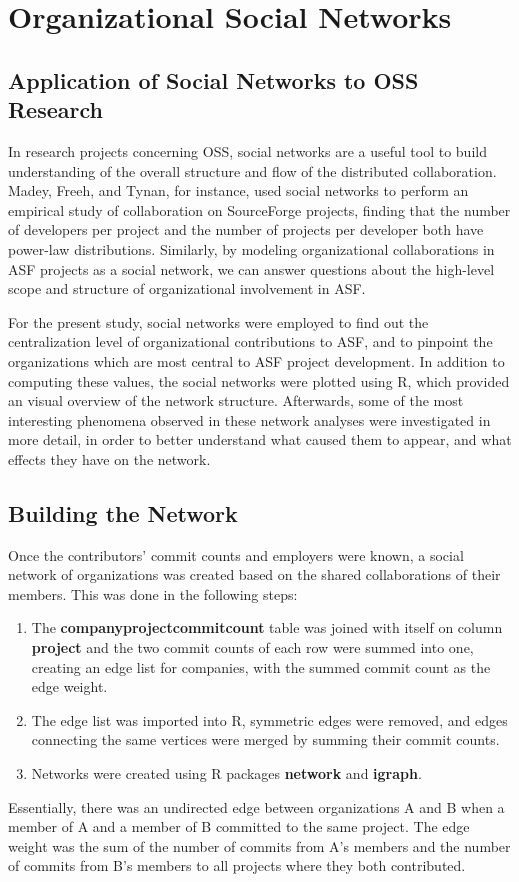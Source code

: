 \chapter{Organizational Social Networks}
\section{Application of Social Networks to OSS Research}
In research projects concerning OSS, social networks are a useful tool to build understanding of the overall structure and flow of the distributed collaboration. Madey, Freeh, and Tynan\cite{madey2002open}, for instance, used social networks to perform an empirical study of collaboration on SourceForge projects, finding that the number of developers per project and the number of projects per developer both have power-law distributions. Similarly, by modeling organizational collaborations in ASF projects as a social network, we can answer questions about the high-level scope and structure of organizational involvement in ASF.

For the present study, social networks were employed to find out the centralization level of organizational contributions to ASF, and to pinpoint the organizations which are most central to ASF project development. In addition to computing these values, the social networks were plotted using R, which provided an visual overview of the network structure. Afterwards, some of the most interesting phenomena observed in these network analyses were investigated in more detail, in order to better understand what caused them to appear, and what effects they have on the network.
\section{Building the Network}
Once the contributors' commit counts and employers were known, a social network of organizations was created based on the shared collaborations of their members. This was done in the following steps:
\begin{enumerate}
	\item The \textbf{companyprojectcommitcount} table was joined with itself on column \textbf{project} and the two commit counts of each row were summed into one, creating an edge list for companies, with the summed commit count as the edge weight.
	\item The edge list was imported into R, symmetric edges were removed, and edges connecting the same vertices were merged by summing their commit counts.
	\item Networks were created using R packages \textbf{network} and \textbf{igraph}.
\end{enumerate}
Essentially, there was an undirected edge between organizations A and B when a member of A and a member of B committed to the same project. The edge weight was the sum of the number of commits from A's members and the number of commits from B's members to all projects where they both contributed.

